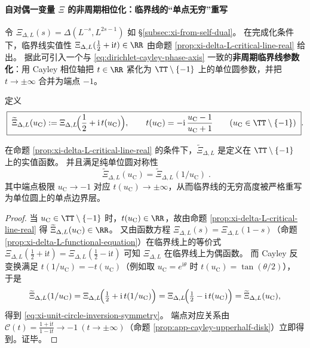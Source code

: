 \paragraph{自对偶一变量 \texorpdfstring{$\Xi$}{Xi} 的非周期相位化：临界线的“单点无穷”重写}
令 \(\Xi_{\Delta,L}(s)=\Delta(L^{-s},L^{2s-1})\) 如 \S\ref{subsec:xi-from-self-dual}。
在完成化条件下，临界线实值性
\(
\Xi_{\Delta,L}(\tfrac12+\mathrm{i}t)\in\RR
\)
由命题 \ref{prop:xi-delta-L-critical-line-real} 给出。
据此可引入一个与 \eqref{eq:dirichlet-cayley-phase-axis} 一致的\textbf{非周期临界线参数化}：用 Cayley 相位轴把 \(t\in\RR\) 紧化为 \(\TT\setminus\{-1\}\) 上的单位圆参数，并把 \(t\to\pm\infty\) 合并为端点 \(-1\)。

\begin{definition}[非周期临界线相位化]\label{def:xi-nonperiodic-phase}
定义
\begin{equation}\label{eq:xi-nonperiodic-phase}
\boxed{\;
\widetilde{\Xi}_{\Delta,L}(u_{\mathrm C})
:=\Xi_{\Delta,L}\!\Bigl(\frac12+\mathrm{i}\,t(u_{\mathrm C})\Bigr),
\qquad
t(u_{\mathrm C})=-\mathrm{i}\,\frac{u_{\mathrm C}-1}{u_{\mathrm C}+1}
\qquad
(u_{\mathrm C}\in\TT\setminus\{-1\})\; }.
\end{equation}
\end{definition}

\begin{proposition}\label{prop:xi-nonperiodic-phase-symmetry}
在命题 \ref{prop:xi-delta-L-critical-line-real} 的条件下，\(\widetilde{\Xi}_{\Delta,L}\) 是定义在 \(\TT\setminus\{-1\}\) 上的实值函数。
并且满足纯单位圆对称性
\begin{equation}\label{eq:xi-unit-circle-inversion-symmetry}
\boxed{\;
\widetilde{\Xi}_{\Delta,L}(u_{\mathrm C})
=\widetilde{\Xi}_{\Delta,L}(1/u_{\mathrm C})\; }.
\end{equation}
其中端点极限 \(u_{\mathrm C}\to-1\) 对应 \(t(u_{\mathrm C})\to\pm\infty\)，从而临界线的无穷高度被严格重写为单位圆上的单点边界层。
\end{proposition}
\begin{proof}
当 \(u_{\mathrm C}\in\TT\setminus\{-1\}\) 时，\(t(u_{\mathrm C})\in\RR\)，故由命题 \ref{prop:xi-delta-L-critical-line-real} 得 \(\widetilde{\Xi}_{\Delta,L}(u_{\mathrm C})\in\RR\)。
又由函数方程 \(\Xi_{\Delta,L}(s)=\Xi_{\Delta,L}(1-s)\)（命题 \ref{prop:xi-delta-L-functional-equation}）在临界线上的等价式
\(
\Xi_{\Delta,L}(\tfrac12+\mathrm{i}t)=\Xi_{\Delta,L}(\tfrac12-\mathrm{i}t)
\)
可知 \(\Xi_{\Delta,L}\) 在临界线上为偶函数。
而 Cayley 反变换满足 \(t(1/u_{\mathrm C})=-t(u_{\mathrm C})\)（例如取 \(u_{\mathrm C}=e^{\mathrm{i}\theta}\) 时 \(t(u_{\mathrm C})=\tan(\theta/2)\)），
于是
\[
\widetilde{\Xi}_{\Delta,L}(1/u_{\mathrm C})
=\Xi_{\Delta,L}\!\Bigl(\tfrac12+\mathrm{i}\,t(1/u_{\mathrm C})\Bigr)
=\Xi_{\Delta,L}\!\Bigl(\tfrac12-\mathrm{i}\,t(u_{\mathrm C})\Bigr)
=\widetilde{\Xi}_{\Delta,L}(u_{\mathrm C}),
\]
得到 \eqref{eq:xi-unit-circle-inversion-symmetry}。
端点对应关系由 \(\mathcal{C}(t)=\frac{1+\mathrm{i}t}{1-\mathrm{i}t}\to-1\ (t\to\pm\infty)\)（命题 \ref{prop:app-cayley-upperhalf-disk}）立即得到。证毕。
\end{proof}

